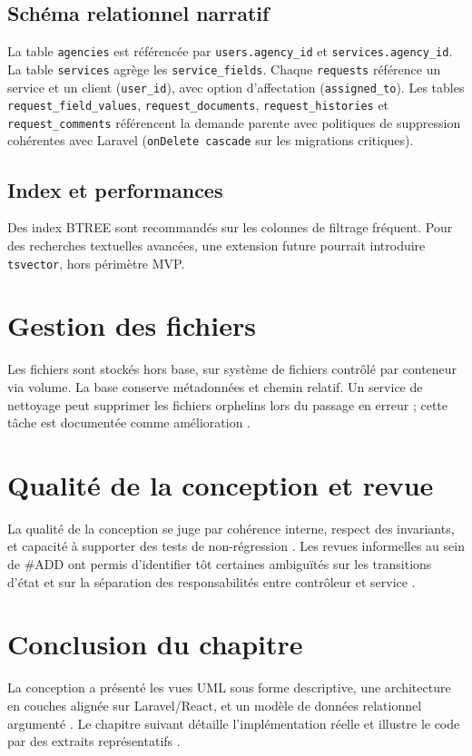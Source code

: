 \subsection{Schéma relationnel narratif}

La table \texttt{agencies} est référencée par \texttt{users.agency\_id} et \texttt{services.agency\_id}. La table \texttt{services} agrège les \texttt{service\_fields}. Chaque \texttt{requests} référence un service et un client (\texttt{user\_id}), avec option d'affectation (\texttt{assigned\_to}). Les tables \texttt{request\_field\_values}, \texttt{request\_documents}, \texttt{request\_histories} et \texttt{request\_comments} référencent la demande parente avec politiques de suppression cohérentes avec Laravel (\texttt{onDelete cascade} sur les migrations critiques).

\subsection{Index et performances}

Des index BTREE sont recommandés sur les colonnes de filtrage fréquent. Pour des recherches textuelles avancées, une extension future pourrait introduire \texttt{tsvector}, hors périmètre MVP.

\section{Gestion des fichiers}

Les fichiers sont stockés hors base, sur système de fichiers contrôlé par conteneur via volume. La base conserve métadonnées et chemin relatif. Un service de nettoyage peut supprimer les fichiers orphelins lors du passage en erreur ; cette tâche est documentée comme amélioration \cite{kleppmann2017,dockerdoc}.

\section{Qualité de la conception et revue}

La qualité de la conception se juge par cohérence interne, respect des invariants, et capacité à supporter des tests de non-régression \cite{ieee1012,sommerville2016}. Les revues informelles au sein de \#ADD ont permis d'identifier tôt certaines ambiguïtés sur les transitions d'état et sur la séparation des responsabilités entre contrôleur et service \cite{pressman2014}.

\section{Conclusion du chapitre}

La conception a présenté les vues UML sous forme descriptive, une architecture en couches alignée sur Laravel/React, et un modèle de données relationnel argumenté \cite{date2003,booch2005}. Le chapitre suivant détaille l'implémentation réelle et illustre le code par des extraits représentatifs \cite{laraveldoc,reactdoc,postgresdoc}.

